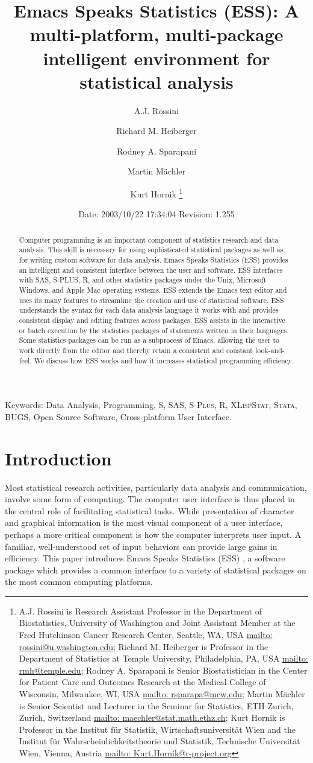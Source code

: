 \documentclass{article}
\title{Emacs Speaks Statistics (ESS): A multi-platform, multi-package
intelligent environment for statistical analysis}
\author{A.J. Rossini \and Richard M. Heiberger \and Rodney A. Sparapani
\and Martin M{\"a}chler \and Kurt Hornik \footnote{%
    A.J. Rossini is Research Assistant Professor in the Department of
    Biostatistics, University of Washington and Joint Assistant Member at
    the Fred Hutchinson Cancer Research Center, Seattle, WA, USA
    \url{mailto: rossini@u.washington.edu};
    Richard M. Heiberger is Professor in the Department of Statistics at
    Temple University, Philadelphia, PA, USA \url{mailto: rmh@temple.edu};
    Rodney A. Sparapani is Senior Biostatistician in the Center for Patient
    Care and Outcomes Research at the Medical College of Wisconsin,
    Milwaukee, WI, USA \url{mailto: rsparapa@mcw.edu};
    Martin M{\"a}chler is Senior Scientist and Lecturer in the Seminar for
    Statistics, ETH Zurich, Zurich, Switzerland
    \url{mailto: maechler@stat.math.ethz.ch};
    Kurt Hornik is Professor in the Institut f{\"u}r Statistik,
    Wirtschaftsuniversit{\"a}t Wien and the Institut f{\"u}r
    Wahrscheinlichkeitstheorie und Statistik, Technische Universit{\"a}t
    Wien, Vienna, Austria \url{mailto: Kurt.Hornik@r-project.org}}}
\date{$ $Date: 2003/10/22 17:34:04 $ $\tiny Revision: 1.255$ $}
\newif\ifdraft
\renewcommand{\baselinestretch}{1.5}
\newcommand*{\SAS}{\textsc{SAS}}
\newcommand*{\Splus}{\textsc{S-Plus}}
\newcommand*{\XLispStat}{\textsc{XLispStat}}
\newcommand*{\Stata}{\textsc{Stata}}
\begin{document}

\ifdraft
\setcounter{page}{0}
\tableofcontents
\fi

\maketitle

\ifdraft{}%
\else%
 \renewcommand{\baselinestretch}{1.5}
\fi

\begin{abstract}
  Computer programming is an important component of statistics
  research and data analysis.  This skill is necessary for using
  sophisticated statistical packages as well as for writing custom
  software for data analysis.  Emacs Speaks Statistics (ESS) provides
  an intelligent and consistent interface between the user and
  software.  ESS interfaces with SAS, S-PLUS, R, and other statistics
  packages under the Unix, Microsoft Windows, and Apple Mac operating
  systems.  ESS extends the Emacs text editor and uses its many
  features to streamline the creation and use of statistical software.
  ESS understands the syntax for each data analysis language it works
  with and provides consistent display and editing features across
  packages.  ESS assists in the interactive or batch execution by the
  statistics packages of statements written in their languages.  Some
  statistics packages can be run as a subprocess of Emacs, allowing
  the user to work directly from the editor and thereby retain a
  consistent and constant look-and-feel.  We discuss how ESS works and
  how it increases statistical programming efficiency.
\end{abstract}

\noindent Keywords: Data Analysis, Programming,
S, \SAS, \Splus, R, \XLispStat, \Stata, BUGS, Open Source Software,
Cross-platform User Interface.

\section{Introduction}
\label{sec:introduction}

Most statistical research activities, particularly data analysis and
communication, involve some form of computing.  The computer user
interface is thus placed in the central role of facilitating
statistical tasks.  While presentation of character and graphical
information is the most visual component of a user interface,
perhaps a more critical component is how the computer interprets user
input.  A familiar, well-understood set of input behaviors can provide
large gains in efficiency.  This paper introduces Emacs Speaks
Statistics (ESS) \citep{ESS}, a software package which provides a
common interface to a variety of statistical packages on the most
common computing platforms.
\end{document}
